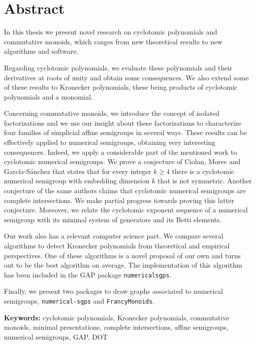 \chapter*{Abstract}

In this thesis we present novel research on cyclotomic polynomials and commutative monoids, which ranges from new theoretical results to new algorithms and software.

Regarding cyclotomic polynomials, we evaluate these polynomials and their derivatives at roots of unity and obtain some consequences. We also extend some of these results to Kronecker polynomials, these being products of cyclotomic polynomials and a monomial.

Concerning commutative monoids, we introduce the concept of isolated factorizations and we use our insight about these factorizations to characterize four families of simplicial affine semigroups in several ways. These results can be effectively applied to numerical semigroups, obtaining very interesting consequences. Indeed, we apply a considerable part of the mentioned work to cyclotomic numerical semigroups. We prove a conjecture of Ciolan, Moree and García-Sánchez that states that for every integer $k \ge 4$ there is a cyclotomic numerical semigroup with embedding dimension $k$ that is not symmetric. Another conjecture of the same authors claims that cyclotomic numerical semigroups are complete intersections. We make partial progress towards proving this latter conjecture. Moreover, we relate the cyclotomic exponent sequence of a numerical semigroup with its minimal system of generators and its Betti elements.

Our work also has a relevant computer science part. We compare several algorithms to detect Kronecker polynomials from theoretical and empirical perspectives. One of these algorithms is a novel proposal of our own and turns out to be the best algorithm on average. The implementation of this algorithm has been included in the GAP package \texttt{numericalsgps}.

Finally, we present two packages to draw graphs associated to numerical semigroups, \texttt{numerical-sgps} and \texttt{FrancyMonoids}.


\textbf{Keywords:} cyclotomic polynomials, Kronecker polynomials, commutative monoids, minimal presentations, complete intersections, affine semigroups, numerical semigroups, GAP, DOT

